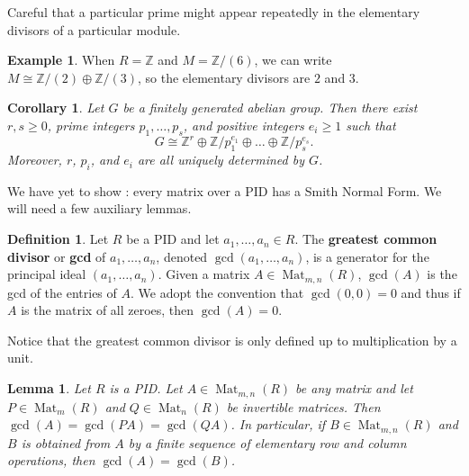 \documentclass[12pt]{report}
\newtheorem{lemma}[theorem]{Lemma}
\newtheorem{corollary}[theorem]{Corollary}
\numberwithin{equation}{section}
\numberwithin{theorem}{chapter}
\theoremstyle{definition}
\newtheorem{definition}[theorem]{Definition}
\newtheorem{example}[theorem]{Example}
\newtheorem*{basic properties}{Basic Properties}
\newtheorem*{Important Remark}{Important Remark}
\newcommand{\df}[1]{{\bf #1}\index{#1}}
\newcommand{\Z}{\mathbb{Z}}
\DeclareMathOperator{\M}{Mat}
\begin{document}
Careful that a particular prime might appear repeatedly in the elementary divisors of a particular module.

\begin{example}
When $R = \Z$ and $M = \Z/(6)$, we can write $M\cong \Z/(2)\oplus \Z/(3)$, so the elementary divisors are $2$ and $3$.
\end{example}


\begin{corollary}
Let $G$ be a finitely generated abelian group. Then there exist $r,s \geqslant 0$, prime integers $p_1, \ldots, p_s $, and positive integers $e_i \geqslant 1$ such that 
$$G \cong \Z^r\oplus \Z/p_1^{e_1} \oplus \dots \oplus \Z/p_s^{e_s}.$$
Moreover, $r$, $p_i$, and $e_i$ are all uniquely determined by $G$.
\end{corollary}




We have yet to show : every matrix over a PID has a Smith Normal Form. We will need a few auxiliary lemmas.




\begin{definition}
Let $R$ be a PID and let $a_1, \ldots, a_n \in R$. The \df{greatest common divisor} or \df{gcd} of $a_1, \ldots, a_n$, denoted $\gcd(a_1, \ldots, a_n)$, is a generator for the principal ideal $(a_1, \ldots, a_n)$. Given a matrix $A \in \M_{m,n}(R)$, $\gcd(A)$ is the gcd of the entries of $A$. We adopt the convention that $\gcd(0,0)=0$ and thus if $A$ is the matrix of all zeroes, then $\gcd(A) = 0$.
\end{definition}
 
Notice that the greatest common divisor is only defined up to multiplication by a unit. 

\begin{lemma}\label{lemma gcd stays the same} 
Let $R$ is a PID. Let $A \in \M_{m,n}(R)$ be any matrix and let $P \in \M_m(R)$ and $Q \in \M_n(R)$ be invertible matrices. Then $\gcd(A) = \gcd(PA) = \gcd(QA)$.
In particular, if $B \in \M_{m,n}(R)$ and $B$ is obtained from $A$ by a finite sequence of elementary row and column operations, then $\gcd(A) = \gcd(B)$. 
\end{lemma}
\end{document}
